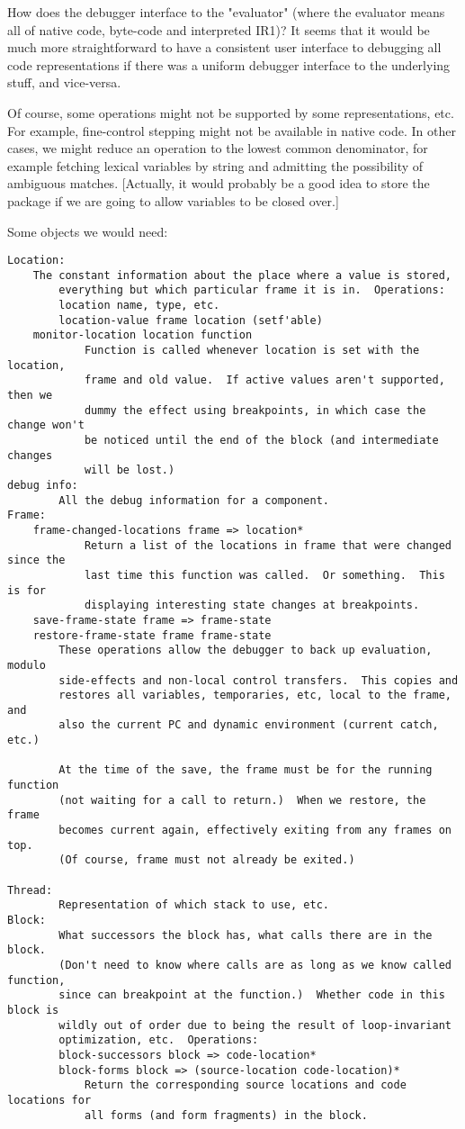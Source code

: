 How does the debugger interface to the "evaluator" (where the evaluator means
all of native code, byte-code and interpreted IR1)?  It seems that it would be
much more straightforward to have a consistent user interface to debugging
all code representations if there was a uniform debugger interface to the
underlying stuff, and vice-versa.  

Of course, some operations might not be supported by some representations, etc.
For example, fine-control stepping might not be available in native code.
In other cases, we might reduce an operation to the lowest common denominator,
for example fetching lexical variables by string and admitting the possibility
of ambiguous matches.  [Actually, it would probably be a good idea to store the
package if we are going to allow variables to be closed over.]

Some objects we would need:
\begin{verbatim}
Location:
	The constant information about the place where a value is stored,
        everything but which particular frame it is in.  Operations:
        location name, type, etc.
        location-value frame location (setf'able)
	monitor-location location function
            Function is called whenever location is set with the location,
            frame and old value.  If active values aren't supported, then we
            dummy the effect using breakpoints, in which case the change won't
            be noticed until the end of the block (and intermediate changes
            will be lost.)
debug info:
        All the debug information for a component.
Frame:
	frame-changed-locations frame => location*
            Return a list of the locations in frame that were changed since the
            last time this function was called.  Or something.  This is for
            displaying interesting state changes at breakpoints.
	save-frame-state frame => frame-state
	restore-frame-state frame frame-state
	    These operations allow the debugger to back up evaluation, modulo
	    side-effects and non-local control transfers.  This copies and
	    restores all variables, temporaries, etc, local to the frame, and
	    also the current PC and dynamic environment (current catch, etc.)

	    At the time of the save, the frame must be for the running function
	    (not waiting for a call to return.)  When we restore, the frame
	    becomes current again, effectively exiting from any frames on top.
	    (Of course, frame must not already be exited.)
       
Thread:
        Representation of which stack to use, etc.
Block:
        What successors the block has, what calls there are in the block.
        (Don't need to know where calls are as long as we know called function,
        since can breakpoint at the function.)  Whether code in this block is
        wildly out of order due to being the result of loop-invariant
        optimization, etc.  Operations:
        block-successors block => code-location*
        block-forms block => (source-location code-location)*
            Return the corresponding source locations and code locations for
            all forms (and form fragments) in the block.
\end{verbatim}

